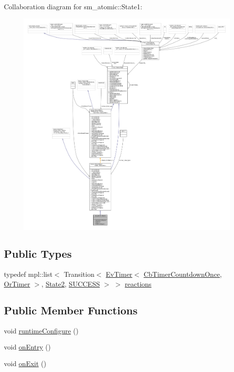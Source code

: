 Collaboration diagram for sm\+\_\+atomic\+:\+:State1\+:
\nopagebreak
\begin{figure}[H]
\begin{center}
\leavevmode
\includegraphics[width=350pt]{structsm__atomic_1_1State1__coll__graph}
\end{center}
\end{figure}
\subsection*{Public Types}
\begin{DoxyCompactItemize}
\item 
typedef mpl\+::list$<$ Transition$<$ \hyperlink{structcl__ros__timer_1_1EvTimer}{Ev\+Timer}$<$ \hyperlink{classcl__ros__timer_1_1CbTimerCountdownOnce}{Cb\+Timer\+Countdown\+Once}, \hyperlink{classsm__atomic_1_1OrTimer}{Or\+Timer} $>$, \hyperlink{structsm__atomic_1_1State2}{State2}, \hyperlink{structsmacc_1_1default__transition__tags_1_1SUCCESS}{S\+U\+C\+C\+E\+SS} $>$ $>$ \hyperlink{structsm__atomic_1_1State1_ab05a524c2d0d99c2ca7c4174d49de73c}{reactions}
\end{DoxyCompactItemize}
\subsection*{Public Member Functions}
\begin{DoxyCompactItemize}
\item 
void \hyperlink{structsm__atomic_1_1State1_a47c2e651bb707f14d9b32f92c44f8ebc}{runtime\+Configure} ()
\item 
void \hyperlink{structsm__atomic_1_1State1_ad6ed37a83a5afaae623428d4342c1cd3}{on\+Entry} ()
\item 
void \hyperlink{structsm__atomic_1_1State1_a712eff5101ad5f9af2d6667230f4ffc3}{on\+Exit} ()
\end{DoxyCompactItemize}
